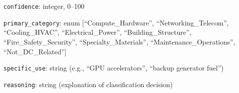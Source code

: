 \documentclass[12pt,pdftex]{article}
\newenvironment{prompt}{\par\medskip\noindent}{\par\medskip}
\begin{document}
\begin{onehalfspacing}
\begin{prompt}
\texttt{confidence}: integer, 0--100

\texttt{primary\_category}: enum [``Compute\_Hardware'', ``Networking\_Telecom'', ``Cooling\_HVAC'', ``Electrical\_Power'', ``Building\_Structure'', ``Fire\_Safety\_Security'', ``Specialty\_Materials'', ``Maintenance\_Operations'', ``Not\_DC\_Related'']

\texttt{specific\_use}: string (e.g., ``GPU accelerators'', ``backup generator fuel'')

\texttt{reasoning}: string (explanation of classification decision)

\end{prompt}

\newpage

\afterpage{%
\clearpage

}


\newpage

\afterpage{%
\clearpage

}



\end{onehalfspacing}
\end{document}
